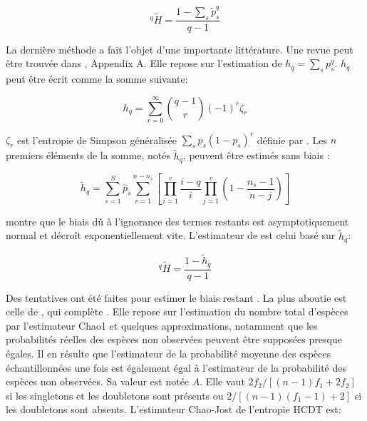 \documentclass[
  11pt,
  american,
  a4paper,
  extrafontsizes,onecolumn,openright
  ]{memoir}
\begin{document}
\begin{equation}
  ^{q}{\tilde{H}}
  = \frac{1 - \sum_{s}{\tilde{p}^{q}_{s}}}{q - 1}
  \label{eq:Grassberger}
\end{equation}

La dernière méthode a fait l'objet d'une importante littérature.
Une revue peut être trouvée dans \textcite{Chao2013}, Appendix A.
Elle repose sur l'estimation de \(h_q = \sum_{s}{p_s^q}\).
\(h_q\) peut être écrit comme la somme suivante:

\begin{equation}
    h_q = \sum_{r=0}^{\infty}{\binom{q - 1}{r} \left( -1 \right)^r \zeta_r}
  \label{eq:hq}
\end{equation}

\(\zeta_r\) est l'entropie de Simpson généralisée \(\sum_{s}{p_s(1 - p_s)^r}\) définie par \textcite{Zhang2010}.
Les \(n\) premiers éléments de la somme, notés \(\tilde{h}_{q}\), peuvent être estimés sans biais \autocite{Zhang2014}:

\begin{equation}
  \tilde{h}_{q} 
  = \sum_{s=1}^{S}{\hat{p}_{s}
    \sum_{v=1}^{n - n_s}{\left[ 
      \prod_{i=1}^{v}{\frac{i - q}{i} \prod_{j=1}^{v}{\left( 1 - \frac{n_s - 1}{n - j} \right)}} 
    \right]
  }}
\end{equation}

\textcite{Zhang2013a} montre que le biais dû à l'ignorance des termes restants est asymptotiquement normal et décroît exponentiellement vite.
L'estimateur de \textcite{Zhang2014} est celui basé sur \(\tilde{h}_{q}\):

\begin{equation}
  ^{q}{\tilde{H}} = \frac{1 - \tilde{h}_{q}}{q - 1}
  \label{eq:Zhang2014}
\end{equation}

Des tentatives ont été faites pour estimer le biais restant \autocite{Zhang2013}.
La plus aboutie est celle de \textcite{Chao2015}, qui complète \textcite{Chao2013}.
Elle repose sur l'estimation du nombre total d'espèces par l'estimateur Chao1 et quelques approximations, notamment que les probabilités réelles des espèces non observées peuvent être supposées presque égales.
Il en résulte que l'estimateur de la probabilité moyenne des espèces échantillonnées une fois est également égal à l'estimateur de la probabilité des espèces non observées.
Sa valeur est notée \(A\).
Elle vaut \(2 f_2 / [(n - 1) f_1 +2 f_2]\) si les singletons et les doubletons sont présents ou \(2 / [(n - 1)(f_1 -1) + 2]\) si les doubletons sont absents.
L'estimateur Chao-Jost de l'entropie HCDT est:
\end{document}
